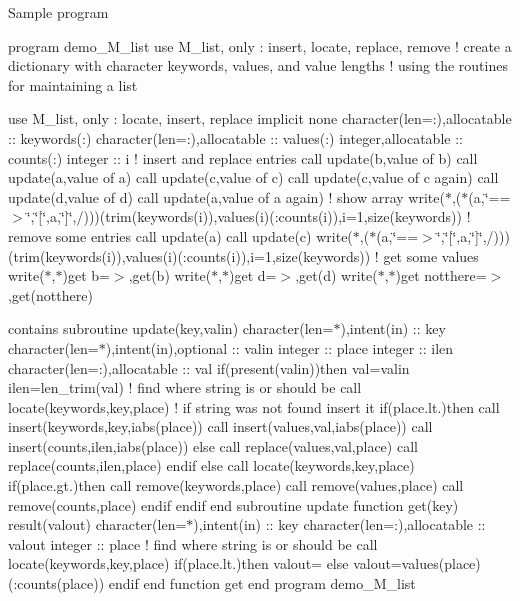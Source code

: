 Sample program

program demo\+\_\+\+M\+\_\+list use M\+\_\+list, only \+: insert, locate, replace, remove ! create a dictionary with character keywords, values, and value lengths ! using the routines for maintaining a list

use M\+\_\+list, only \+: locate, insert, replace implicit none character(len=\+:),allocatable \+:\+: keywords(\+:) character(len=\+:),allocatable \+:\+: values(\+:) integer,allocatable \+:\+: counts(\+:) integer \+:\+: i ! insert and replace entries call update(\textquotesingle{}b\textquotesingle{},\textquotesingle{}value of b\textquotesingle{}) call update(\textquotesingle{}a\textquotesingle{},\textquotesingle{}value of a\textquotesingle{}) call update(\textquotesingle{}c\textquotesingle{},\textquotesingle{}value of c\textquotesingle{}) call update(\textquotesingle{}c\textquotesingle{},\textquotesingle{}value of c again\textquotesingle{}) call update(\textquotesingle{}d\textquotesingle{},\textquotesingle{}value of d\textquotesingle{}) call update(\textquotesingle{}a\textquotesingle{},\textquotesingle{}value of a again\textquotesingle{}) ! show array write($\ast$,\textquotesingle{}($\ast$(a,\char`\"{}==$>$\char`\"{},\char`\"{}\mbox{[}\char`\"{},a,\char`\"{}\mbox{]}\char`\"{},/))\textquotesingle{})(trim(keywords(i)),values(i)(\+:counts(i)),i=1,size(keywords)) ! remove some entries call update(\textquotesingle{}a\textquotesingle{}) call update(\textquotesingle{}c\textquotesingle{}) write($\ast$,\textquotesingle{}($\ast$(a,\char`\"{}==$>$\char`\"{},\char`\"{}\mbox{[}\char`\"{},a,\char`\"{}\mbox{]}\char`\"{},/))\textquotesingle{})(trim(keywords(i)),values(i)(\+:counts(i)),i=1,size(keywords)) ! get some values write($\ast$,$\ast$)\textquotesingle{}get b=$>$\textquotesingle{},get(\textquotesingle{}b\textquotesingle{}) write($\ast$,$\ast$)\textquotesingle{}get d=$>$\textquotesingle{},get(\textquotesingle{}d\textquotesingle{}) write($\ast$,$\ast$)\textquotesingle{}get notthere=$>$\textquotesingle{},get(\textquotesingle{}notthere\textquotesingle{})

contains subroutine update(key,valin) character(len=$\ast$),intent(in) \+:\+: key character(len=$\ast$),intent(in),optional \+:\+: valin integer \+:\+: place integer \+:\+: ilen character(len=\+:),allocatable \+:\+: val if(present(valin))then val=valin ilen=len\+\_\+trim(val) ! find where string is or should be call locate(keywords,key,place) ! if string was not found insert it if(place.\+lt.)then call insert(keywords,key,iabs(place)) call insert(values,val,iabs(place)) call insert(counts,ilen,iabs(place)) else call replace(values,val,place) call replace(counts,ilen,place) endif else call locate(keywords,key,place) if(place.\+gt.)then call remove(keywords,place) call remove(values,place) call remove(counts,place) endif endif end subroutine update function get(key) result(valout) character(len=$\ast$),intent(in) \+:\+: key character(len=\+:),allocatable \+:\+: valout integer \+:\+: place ! find where string is or should be call locate(keywords,key,place) if(place.\+lt.)then valout=\textquotesingle{}\textquotesingle{} else valout=values(place)(\+:counts(place)) endif end function get end program demo\+\_\+\+M\+\_\+list

